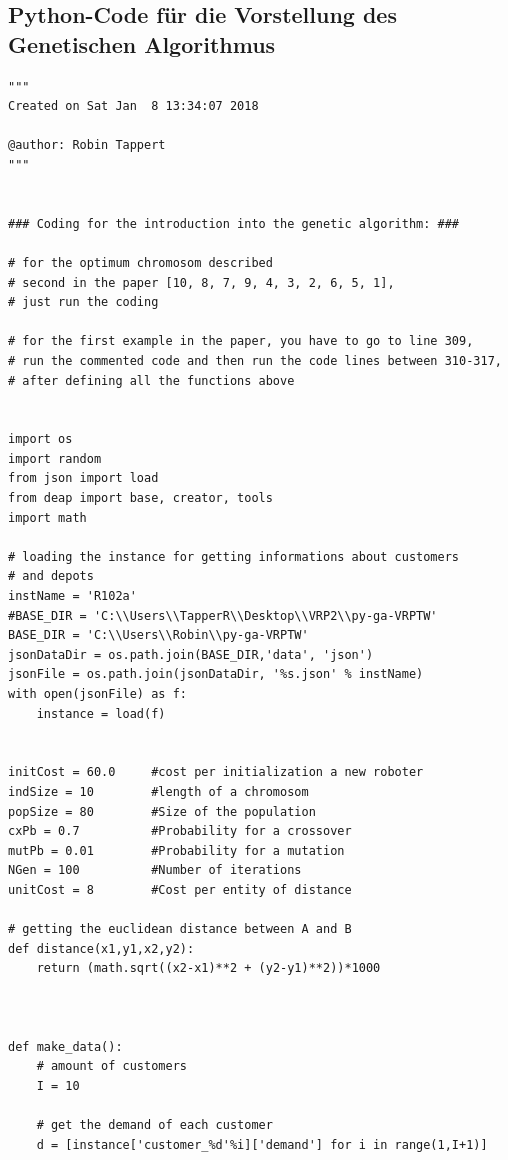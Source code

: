\documentclass[a4paper,12pt,parskip,bibtotoc,liststotoc]{article}
\begin{document}
\begin{appendix}

\section{Python-Code für die Vorstellung des Genetischen Algorithmus}
\begin{lstlisting}
"""
Created on Sat Jan  8 13:34:07 2018

@author: Robin Tappert
"""


### Coding for the introduction into the genetic algorithm: ###
    
# for the optimum chromosom described
# second in the paper [10, 8, 7, 9, 4, 3, 2, 6, 5, 1], 
# just run the coding

# for the first example in the paper, you have to go to line 309, 
# run the commented code and then run the code lines between 310-317, 
# after defining all the functions above


import os
import random
from json import load
from deap import base, creator, tools
import math

# loading the instance for getting informations about customers 
# and depots
instName = 'R102a'
#BASE_DIR = 'C:\\Users\\TapperR\\Desktop\\VRP2\\py-ga-VRPTW'
BASE_DIR = 'C:\\Users\\Robin\\py-ga-VRPTW'
jsonDataDir = os.path.join(BASE_DIR,'data', 'json')
jsonFile = os.path.join(jsonDataDir, '%s.json' % instName)
with open(jsonFile) as f:
    instance = load(f)
    
    
initCost = 60.0     #cost per initialization a new roboter
indSize = 10        #length of a chromosom
popSize = 80        #Size of the population
cxPb = 0.7          #Probability for a crossover
mutPb = 0.01        #Probability for a mutation
NGen = 100          #Number of iterations 
unitCost = 8        #Cost per entity of distance 

# getting the euclidean distance between A and B
def distance(x1,y1,x2,y2):
    return (math.sqrt((x2-x1)**2 + (y2-y1)**2))*1000



def make_data():
    # amount of customers
    I = 10
    
    # get the demand of each customer
    d = [instance['customer_%d'%i]['demand'] for i in range(1,I+1)]  


\end{lstlisting}
\end{appendix}
\end{document}
